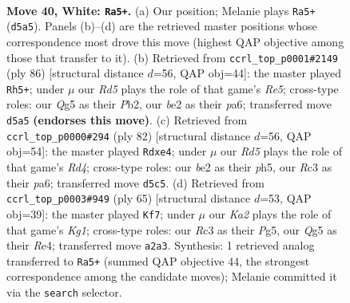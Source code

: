 \documentclass[11pt]{article}
\begin{document}
\clearpage

\begin{figure}[p]\centering
\begin{subfigure}{0.46\textwidth}\centering
\resizebox{\linewidth}{!}{%
\newchessgame
\chessboard[
  setfen={k3rn2/1p6/1r1p4/3R2Q1/4Pp2/1PR5/K3b1PP/8 w - - 0 40},
  showmover=false,
  pgfstyle=straightmove, color=movearrow, markmove={d5-a5}
]}
\caption{}
\end{subfigure}\hfill
\begin{subfigure}{0.46\textwidth}\centering
\resizebox{\linewidth}{!}{%
\newchessgame
\chessboard[
  setfen={8/6pk/p1r1p3/4R3/3r3P/P1p3PK/1P2R3/8 w - - 0 44},
  showmover=false,
  pgfstyle=straightmove, color=movearrow, markmove={e5-h5}
]}
\caption{}
\end{subfigure}
\\[4pt]
\begin{subfigure}{0.46\textwidth}\centering
\resizebox{\linewidth}{!}{%
\newchessgame
\chessboard[
  setfen={8/1r3p2/pP2k3/4r2p/1P1RpR2/6P1/7P/3K4 w - - 0 42},
  showmover=false,
  pgfstyle=straightmove, color=movearrow, markmove={d4-e4}
]}
\caption{}
\end{subfigure}\hfill
\begin{subfigure}{0.46\textwidth}\centering
\resizebox{\linewidth}{!}{%
\newchessgame
\chessboard[
  setfen={6k1/8/4p2p/1R2P1p1/1p2r3/2r4P/5PP1/1R3K2 b - - 1 33},
  showmover=false,
  pgfstyle=straightmove, color=movearrow, markmove={g8-f7}
]}
\caption{}
\end{subfigure}
\caption{\textbf{Move 40, White: \texttt{Ra5+}.} (a) Our position; Melanie plays \texttt{Ra5+} (\texttt{d5a5}). Panels (b)--(d) are the retrieved master positions whose correspondence most drove this move (highest QAP objective among those that transfer to it). (b) Retrieved from \texttt{ccrl\_top\_p0001\#2149} (ply 86) [structural distance $d$=56, QAP obj=44]: the master played \texttt{Rh5+}; under $\mu$ our \emph{Rd5} plays the role of that game's \emph{Re5}; cross-type roles: our \emph{Q}g5 as their \emph{P}b2, our \emph{b}e2 as their \emph{p}a6; transferred move \texttt{d5a5} \textbf{(endorses this move)}. (c) Retrieved from \texttt{ccrl\_top\_p0000\#294} (ply 82) [structural distance $d$=56, QAP obj=54]: the master played \texttt{Rdxe4}; under $\mu$ our \emph{Rd5} plays the role of that game's \emph{Rd4}; cross-type roles: our \emph{b}e2 as their \emph{p}h5, our \emph{R}c3 as their \emph{p}a6; transferred move \texttt{d5c5}. (d) Retrieved from \texttt{ccrl\_top\_p0003\#949} (ply 65) [structural distance $d$=53, QAP obj=39]: the master played \texttt{Kf7}; under $\mu$ our \emph{Ka2} plays the role of that game's \emph{Kg1}; cross-type roles: our \emph{R}c3 as their \emph{P}g5, our \emph{Q}g5 as their \emph{R}e4; transferred move \texttt{a2a3}. Synthesis: 1 retrieved analog transferred to \texttt{Ra5+} (summed QAP objective 44, the strongest correspondence among the candidate moves); Melanie committed it via the \texttt{search} selector.}
\label{fig:thought-m78}
\end{figure}
\end{document}
